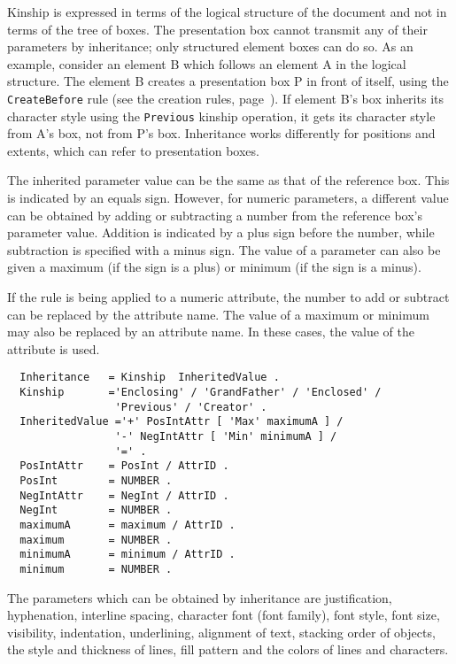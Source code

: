 Kinship is expressed in terms of the logical structure of the
document and not in terms of the tree of boxes.  The presentation box
cannot transmit any of their parameters by inheritance; only
structured element boxes can do so.  As an example, consider an
element B which follows an element A in the logical structure.  The
element B creates a presentation box P in front of itself, using the
{\tt CreateBefore} rule (see the creation rules,
page~\pageref{creation}).  If element B's box inherits its character
style using the {\tt Previous} kinship operation, it gets its
character style from A's box, not from P's box.  Inheritance works
differently for positions and extents, which can refer to presentation
boxes.

The inherited parameter value can be the same as that of the reference
box.  This is indicated by an equals sign.  However, for numeric
parameters, a different value can be obtained by adding or subtracting
a number from the reference box's parameter value.  Addition is
indicated by a plus sign before the number, while subtraction is
specified with a minus sign.  The value of a
parameter can also be given a maximum (if the sign is a plus) or
minimum (if the sign is a minus).

If the rule is being applied to a numeric attribute, the number to add
or subtract can be replaced by the attribute name.  The value of a
maximum or minimum may also be replaced by an attribute name.  In
these cases, the value of the attribute is used.

\begin{verbatim}
  Inheritance   = Kinship  InheritedValue .
  Kinship       ='Enclosing' / 'GrandFather' / 'Enclosed' /
                 'Previous' / 'Creator' .
  InheritedValue ='+' PosIntAttr [ 'Max' maximumA ] /
                 '-' NegIntAttr [ 'Min' minimumA ] /
                 '=' .
  PosIntAttr    = PosInt / AttrID .
  PosInt        = NUMBER .
  NegIntAttr    = NegInt / AttrID .
  NegInt        = NUMBER .
  maximumA      = maximum / AttrID .
  maximum       = NUMBER .
  minimumA      = minimum / AttrID .
  minimum       = NUMBER .
\end{verbatim}

The parameters which can be obtained by inheritance are justification,
hyphenation, interline spacing, character font (font family), font
style, font size, visibility, indentation, underlining, alignment of
text, stacking order of objects, the style and thickness of lines,
fill pattern and the colors of lines and characters.

